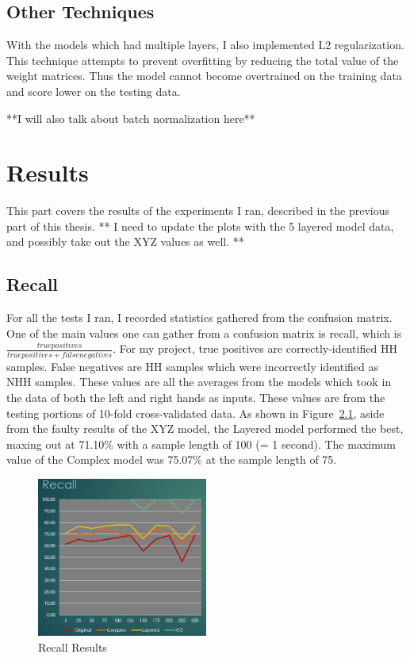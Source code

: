 \documentclass[]{report}
\begin{document}
\section{Other Techniques}

With the models which had multiple layers, I also implemented L2 regularization. This technique attempts to prevent overfitting by reducing the total value of the weight matrices. Thus the model cannot become overtrained on the training data and score lower on the testing data.

**I will also talk about batch normalization here**

\chapter{Results}

This part covers the results of the experiments I ran, described in the previous part of this thesis.
** I need to update the plots with the 5 layered model data, and possibly take out the XYZ values as well. **

\section{Recall}

For all the tests I ran, I recorded statistics gathered from the confusion matrix. One of the main values one can gather from a confusion matrix is recall, which is $\frac{truepositives}{truepositives + falsenegatives}$. For my project, true positives are correctly-identified HH samples. False negatives are HH samples which were incorrectly identified as NHH samples. These values are all the averages from the models which took in the data of both the left and right hands as inputs. These values are from the testing portions of 10-fold cross-validated data. As shown in Figure~\ref{recall}, aside from the faulty results of the XYZ model, the Layered model performed the best, maxing out at 71.10\% with a sample length of 100 (= 1 second). The maximum value of the Complex model was 75.07\% at the sample length of 75. 

\begin{figure}
	\centering
	\includegraphics[width=0.5\textwidth]{../images/recall}
	\caption{Recall Results}
	\label{recall}
\end{figure}
\end{document}
